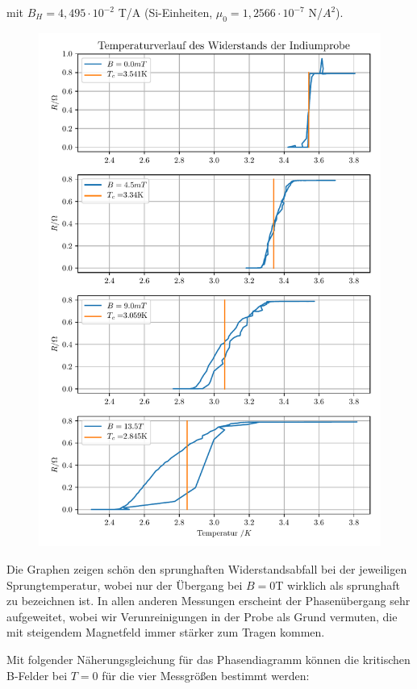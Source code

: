 mit $B_H = 4,495 \cdot 10^{-2}$ T/A (Si-Einheiten, $\mu_0 = 1,2566\cdot 10^{-7}$ N/$A^2$).

\begin{figure}[h]
\includegraphics[width=\textwidth]{Temperaturverlauf_des_Widerstands_der_Indiumprobe.pdf}
\end{figure}

Die Graphen zeigen schön den sprunghaften Widerstandsabfall bei der jeweiligen Sprungtemperatur, wobei nur der Übergang bei $B=0$T wirklich als sprunghaft zu bezeichnen ist. In allen anderen Messungen erscheint der Phasenübergang sehr aufgeweitet, wobei wir Verunreinigungen in der Probe als Grund vermuten, die mit steigendem Magnetfeld immer stärker zum Tragen kommen. 


Mit folgender Näherungsgleichung für das Phasendiagramm können die kritischen B-Felder bei $T=0$ für die vier Messgrößen bestimmt werden:


